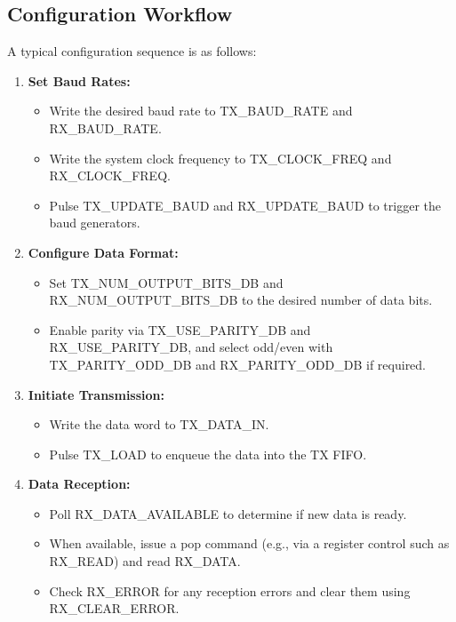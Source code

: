 \subsection{Configuration Workflow}

A typical configuration sequence is as follows:

\begin{enumerate}[noitemsep]
    \item \textbf{Set Baud Rates:}
    \begin{itemize}[noitemsep]
        \item Write the desired baud rate to TX\_BAUD\_RATE and RX\_BAUD\_RATE.
        \item Write the system clock frequency to TX\_CLOCK\_FREQ and RX\_CLOCK\_FREQ.
        \item Pulse TX\_UPDATE\_BAUD and RX\_UPDATE\_BAUD to trigger the baud generators.
    \end{itemize}

    \item \textbf{Configure Data Format:}
    \begin{itemize}[noitemsep]
        \item Set TX\_NUM\_OUTPUT\_BITS\_DB and RX\_NUM\_OUTPUT\_BITS\_DB to the desired number of data bits.
        \item Enable parity via TX\_USE\_PARITY\_DB and RX\_USE\_PARITY\_DB, and select odd/even with TX\_PARITY\_ODD\_DB and RX\_PARITY\_ODD\_DB if required.
    \end{itemize}

    \item \textbf{Initiate Transmission:}
    \begin{itemize}[noitemsep]
        \item Write the data word to TX\_DATA\_IN.
        \item Pulse TX\_LOAD to enqueue the data into the TX FIFO.
    \end{itemize}

    \item \textbf{Data Reception:}
    \begin{itemize}[noitemsep]
        \item Poll RX\_DATA\_AVAILABLE to determine if new data is ready.
        \item When available, issue a pop command (e.g., via a register control such as RX\_READ) and read RX\_DATA.
        \item Check RX\_ERROR for any reception errors and clear them using RX\_CLEAR\_ERROR.
    \end{itemize}
\end{enumerate}

